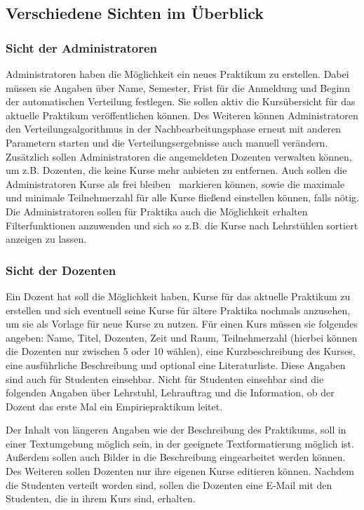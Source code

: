         \subsection{Verschiedene Sichten im Überblick}
        \label{Sichten}
            \subsubsection{Sicht der Administratoren}
                Administratoren haben die Möglichkeit ein neues Praktikum zu erstellen.
                Dabei müssen sie Angaben über Name, Semester, Frist für die Anmeldung und Beginn der automatischen Verteilung festlegen.
                Sie sollen aktiv die Kursübersicht für das aktuelle Praktikum veröffentlichen können.
                Des Weiteren können Administratoren den Verteilungsalgorithmus in der Nachbearbeitungsphase erneut mit anderen Parametern starten und die Verteilungsergebnisse auch manuell verändern.
                Zusätzlich sollen Administratoren die angemeldeten Dozenten verwalten können, um z.B. Dozenten, die keine Kurse mehr anbieten zu entfernen.
                Auch sollen die Administratoren Kurse als \glqq frei bleiben\grqq~ markieren können, sowie die maximale und minimale Teilnehmerzahl für alle Kurse fließend einstellen können, falls nötig.
                Die Administratoren sollen für Praktika auch die Möglichkeit erhalten Filterfunktionen anzuwenden und sich so z.B. die Kurse nach Lehrstühlen sortiert anzeigen zu lassen.
            
            \subsubsection{Sicht der Dozenten}
                Ein Dozent hat soll die Möglichkeit haben, Kurse für das aktuelle Praktikum zu erstellen und sich eventuell seine Kurse für ältere Praktika nochmals anzusehen, um sie als Vorlage für neue Kurse zu nutzen. 
                Für einen Kurs müssen sie folgendes angeben: Name, Titel, Dozenten, Zeit und Raum, Teilnehmerzahl (hierbei können die Dozenten nur zwischen 5 oder 10 wählen), eine Kurzbeschreibung des Kurses, eine ausführliche Beschreibung und optional eine Literaturliste.
                Diese Angaben sind auch für Studenten einsehbar.
                Nicht für Studenten einsehbar sind die folgenden Angaben über Lehrstuhl, Lehrauftrag und die Information, ob der Dozent das erste Mal ein Empiriepraktikum leitet.
                
                Der Inhalt von längeren Angaben wie der Beschreibung des Praktikums, soll in einer Textumgebung möglich sein, in der geeignete Textformatierung möglich ist.
                Außerdem sollen auch Bilder in die Beschreibung eingearbeitet werden können.
                Des Weiteren sollen Dozenten nur ihre eigenen Kurse editieren können.
                Nachdem die Studenten verteilt worden sind, sollen die Dozenten eine E-Mail mit den Studenten, die in ihrem Kurs sind, erhalten.
            
